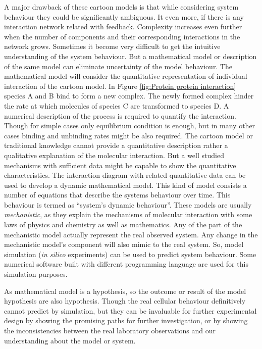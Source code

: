 A major drawback of these cartoon models is that while considering system behaviour they could be significantly 
ambiguous. It even more, if there is any interaction network related with feedback. Complexity increases even
further when the number of components and their corresponding interactions in the network grows. Sometimes it
become very difficult to get the intuitive understanding of the system behaviour. But a mathematical model or
description of the same model can eliminate uncertainty of the model behaviour. The mathematical model will 
consider the quantitative representation of individual interaction of the cartoon model. 
In Figure \ref{fig:Protein protein interaction} species A and B bind to form a new complex. 
The newly formed complex hinder the rate at which molecules of species C are transformed to species D.
A numerical description of the process is required to quantify the interaction. 
Though for simple cases only equilibrium condition is enough, but in many other cases binding and 
unbinding rates might be also required. The cartoon model or traditional knowledge cannot provide a quantitative
description rather a qualitative explanation of the molecular interaction. But a well studied mechanisms with
sufficient data might be capable to show the quantitative characteristics. The interaction diagram with
related quantitative data can be used to develop a dynamic mathematical model. This kind of model consists
a number of equations that describe the systems behaviour over time. This behaviour is termed as ``system's dynamic 
behaviour''. These models are usually \textit{mechanistic}, as they explain the mechanisms of molecular interaction
with some laws of physics and chemistry as well as mathematics. Any of the part of the mechanistic model actually
represent the real observed system. Any change in the mechanistic model's component will also mimic to the real
system. So, model simulation (\textit{in silico} experiments) can be used to predict system behaviour. Some numerical
software built with different programming language are used for this simulation purposes. 

As mathematical model is a hypothesis, so the outcome or result of the model hypothesis are also hypothesis.
Though the real cellular behaviour definitively cannot predict by simulation, but they can be invaluable for 
further experimental design by showing the promising paths for further investigation, or by showing the 
inconsistencies between the real laboratory observations and our understanding about the model or system.

